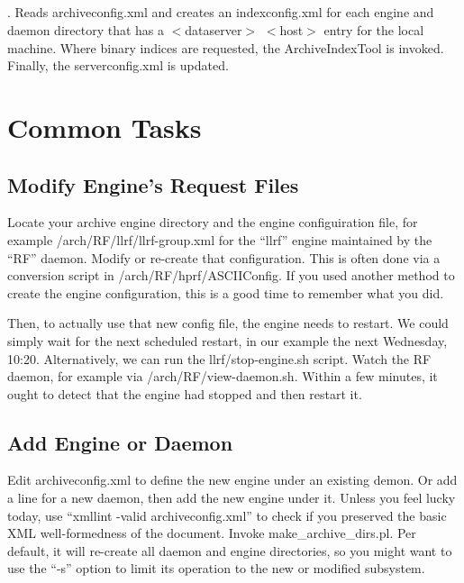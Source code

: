 \subsection{} \label{sec:updateIndices}.
Reads archiveconfig.xml and creates an indexconfig.xml for each
engine and daemon directory that has a $<$dataserver$>$ $<$host$>$
entry for the local machine.
Where binary indices are requested, the ArchiveIndexTool is invoked.
Finally, the serverconfig.xml is updated.

\section{Common Tasks}
\subsection{Modify Engine's Request Files}
Locate your archive engine directory and the engine configuiration
file, for example /arch/RF/llrf/llrf-group.xml for the ``llrf'' engine
maintained by the ``RF'' daemon.
Modify or re-create that configuration. This is often done via a conversion script in
/arch/RF/hprf/ASCIIConfig. If you used another method to create the
engine configuration, this is a good time to remember what you did.

Then, to actually use that new config file, the engine needs to
restart. We could simply wait for the next scheduled restart, in our
example the next Wednesday, 10:20. Alternatively, we can run the
llrf/stop-engine.sh script.
Watch the RF daemon, for example via /arch/RF/view-daemon.sh.
Within a few minutes, it ought to detect that the engine had stopped
and then restart it.

\subsection{Add Engine or Daemon}
Edit archiveconfig.xml to define the new engine under an existing
demon. Or add a line for a new daemon, then add the new engine under
it.  Unless you feel lucky today, use ``xmllint -valid
archiveconfig.xml'' to check if you preserved the basic XML
well-formedness of the document. Invoke make\_archive\_dirs.pl. Per
default, it will re-create all daemon and engine directories, so you
might want to use the ``-s'' option to limit its operation to the new
or modified subsystem.

